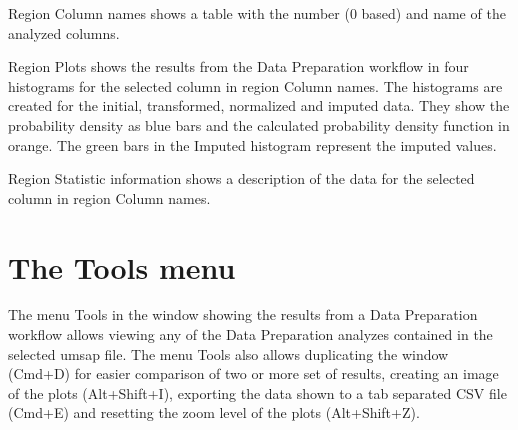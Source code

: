 Region Column names shows a table with the number (\num{0} based) and name of the
analyzed columns.

Region Plots shows the results from the Data Preparation workflow in four histograms
for the selected column in region Column names. The histograms are created for the
initial, transformed, normalized and imputed data. They show the probability density
as blue bars and the calculated probability density function in orange. The green bars
in the Imputed histogram represent the imputed values.

Region Statistic information shows a description of the data for the selected column
in region Column names.

\section{The Tools menu}

The menu Tools in the window showing the results from a Data Preparation workflow
allows viewing any of the Data Preparation analyzes contained in the selected
umsap file. The menu Tools also allows duplicating the window (Cmd+D) for easier
comparison of two or more set of results, creating an image of the plots (Alt+Shift+I),
exporting the data shown to a tab separated CSV file (Cmd+E) and resetting the zoom
level of the plots (Alt+Shift+Z).
